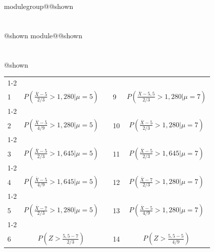 \documentclass{Evaluation}
\makeatletter
\newcommand{\currentmodulekey}{}
\newcommand{\currentmoduletitle}{}
\newcommand{\currentgroupkey}{}
\newcommand{\currentgrouptitle}{}
\newcommand{\showmoduleifneeded}{%
  \ifx\currentgroupkey\empty\else
    \expandafter\ifx\csname modulegroup@\currentgroupkey @shown\endcsname\relax
      \section*{\currentgrouptitle}%
      \expandafter\gdef\csname modulegroup@\currentgroupkey @shown\endcsname{1}%
    \fi
  \fi
  \expandafter\ifx\csname module@\currentmodulekey @shown\endcsname\relax
    \section*{\currentmoduletitle}%
    \expandafter\gdef\csname module@\currentmodulekey @shown\endcsname{1}%
  \fi
}
\newenvironment{A23}{\showmoduleifneeded}{}
\makeatother
\begin{document}
\begin{questions}
\begin{A23}
\begin{center}
\begin{tabular}{|l|c|c|l|c|}
	\cline{1-2}\cline{4-5}
	&&&&\\[-3mm]
	 1 &  $\displaystyle P\left( \frac{\overline{X}-5}{ 2 / 3} > 1,280 \bigg| \mu = 5 \right)$
	 & \hspace{0.3cm} &
	 9 &  $\displaystyle P\left( \frac{\overline{X}-5,5}{ 2 / 3} > 1,280 \bigg| \mu = 7 \right)$
	\\[4mm]
	\cline{1-2}\cline{4-5}
	&&&&\\[-3mm]
	 2 & $\displaystyle P\left( \frac{\overline{X} - 5}{4/9} > 1,280 \bigg| \mu = 5  \right)$
	&  &
	 10 & $\displaystyle P\left( \frac{\overline{X}-5}{ 2 / 3} > 1,280 \bigg| \mu = 7 \right)$ 
	\\[4mm]
	\cline{1-2}\cline{4-5}
	&&&&\\[-3mm]
	 3 & $\displaystyle P\left( \frac{\overline{X}-5}{ 2 / 3} > 1,645 \bigg| \mu = 5 \right)$
	 &  &
	  11 & $\displaystyle P\left( \frac{\overline{X}-5}{ 2 / 3} > 1,645 \bigg| \mu = 7 \right)$
	 \\[4mm]
	 \cline{1-2}\cline{4-5}
	 &&&&\\[-3mm]
	   4 & $\displaystyle P\left( \frac{\overline{X} - 5}{4/9} > 1,645 \bigg| \mu = 5  \right)$
	 &  &
	  12 & $\displaystyle P\left( \frac{\overline{X} - 7}{2/3} > 1,280 \bigg| \mu = 7 \right)$
	 \\[4mm]
	 \cline{1-2}\cline{4-5}
	 &&&&\\[-3mm]
	  5 & $\displaystyle P\left( \frac{\overline{X} - 7}{2/3} > 1,280 \bigg| \mu = 5  \right)$
	 &  &
	  13 & $\displaystyle P\left( \frac{\overline{X}-5}{ 4 / 9} > 1,280 \bigg| \mu = 7 \right)$
	 \\[4mm]
	 \cline{1-2}\cline{4-5}
	 &&&&\\[-3mm]
	  6 & $\displaystyle P\left( Z > \frac{5,5-7}{2/3} \right)$
	 &  &
	  14 & $\displaystyle P\left( Z > \frac{5,5-5}{4/9} \right)$

\end{tabular}
\end{center}
\end{A23}
\end{questions}
\end{document}
